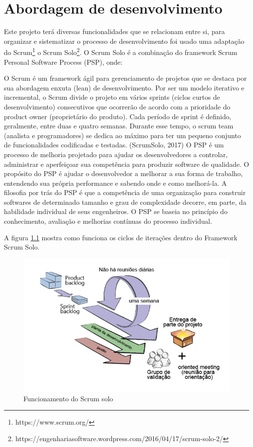 \chapter{Abordagem de desenvolvimento}

Este projeto terá diversas funcionalidades que se relacionam entre si, para organizar e sistematizar o processo de desenvolvimento foi usado uma adaptação do Scrum\footnote{https://www.scrum.org/} o Scrum Solo\footnote{https://engenhariasoftware.wordpress.com/2016/04/17/scrum-solo-2/}. O Scrum Solo é a combinação do framework Scrum Personal Software Process (PSP), onde:

\begin{citacao}
O Scrum é um framework ágil para gerenciamento de projetos que se destaca por sua abordagem enxuta (lean) de desenvolvimento. Por ser um modelo iterativo e incremental, o Scrum divide o projeto em vários sprints (ciclos curtos de desenvolvimento) consecutivos que ocorrerão de acordo com a prioridade do product owner (proprietário do produto). Cada período de sprint é definido, geralmente, entre duas e quatro semanas. Durante esse tempo, o scrum team (analista e programadores) se dedica ao máximo para ter um pequeno conjunto de funcionalidades codificadas e testadas. (ScrumSolo, 2017) O PSP é um processo de melhoria projetado para ajudar os desenvolvedores a controlar, administrar e aperfeiçoar sua competência para produzir software de qualidade. O propósito do PSP é ajudar o desenvolvedor a melhorar a sua forma de trabalho, entendendo sua própria performance e sabendo onde e como melhorá-la. A filosofia por trás do PSP é que a competência de uma organização para construir softwares de determinado tamanho e grau de complexidade decorre, em parte, da habilidade individual de seus engenheiros. O PSP se baseia no princípio do conhecimento, avaliação e melhorias contínuas do processo individual. \cite{ScrumSolo2017}
\end{citacao}

A figura \ref{scrum} mostra como funciona os ciclos de iterações dentro do Framework Scrum Solo.

\begin{figure}[H]
\caption{\label{scrum} Funcionamento do Scrum solo}
\includegraphics[scale=0.33]{img/scrum-solo.png}
\end{figure}

